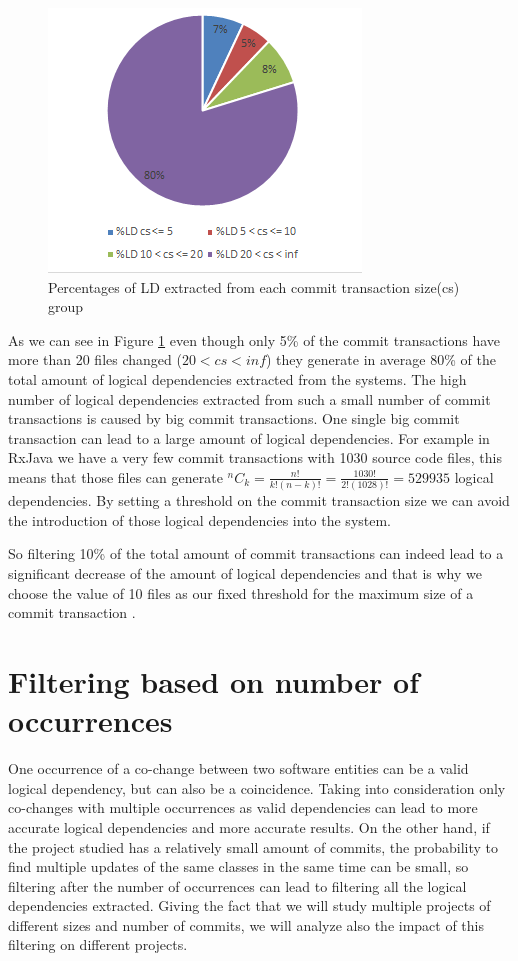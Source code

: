 \documentclass[12pt]{mitthesis}
\newcommand*{\Comb}[2]{{}^{#1}C_{#2}}%
\begin{document}
\begin{figure}[h]
\centering
\includegraphics[scale=0.9]{fig_ld_ts.png}
\caption{Percentages of LD extracted from each commit transaction size(cs) group}
\label{fig:fig_ld_ts}
\centering
\end{figure}

As we can see in Figure \ref{fig:fig_ld_ts} even though only 5\% of the commit transactions have more than 20 files changed ($20<cs<inf$) they generate in average 80\% of the total amount of logical dependencies extracted from the systems.
The high number of logical dependencies extracted from such a small number of commit transactions is caused by big commit transactions. 
One single big commit transaction can lead to a large amount of logical dependencies. For example in RxJava we have a very few commit transactions with 1030 source code files, this means that those files can generate 
$\Comb{n}{k}=\frac{n!}{k!(n-k)!} = \frac{1030!}{2!(1028)!} = 529 935$ logical dependencies. By setting a threshold on the commit transaction size we can avoid the introduction of those logical dependencies into the system.

So filtering 10\% of the total amount of commit transactions can indeed lead to a significant decrease of the amount of logical dependencies and that is why we choose the value of 10 files as our fixed threshold for the maximum size of a commit transaction \cite{DepSACI}.



\section{Filtering based on number of occurrences}
\label{sec:filterocc}
One occurrence of a co-change between two software entities can be a valid logical dependency, but can also be a coincidence. Taking into consideration only co-changes with multiple occurrences as valid dependencies can lead to more accurate logical dependencies and more accurate results. On the other hand, if the project studied has a relatively small amount of commits, the probability to find multiple updates of the same classes in the same time can be small, so filtering after the number of occurrences can lead to filtering all the logical dependencies extracted. Giving the fact that we will study multiple projects of different sizes and number of commits, we will analyze also the impact of this filtering on different projects.
\end{document}
